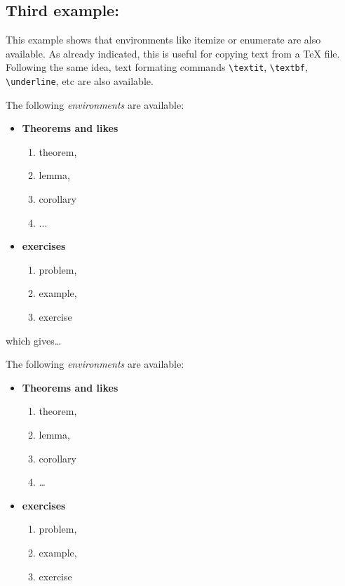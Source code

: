     \subsection{Third example:}\label{third-example}

    This example shows that environments like itemize or enumerate are also
available. As already indicated, this is useful for copying text from a
TeX file. Following the same idea, text formating commands
\texttt{\textbackslash{}textit}, \texttt{\textbackslash{}textbf},
\texttt{\textbackslash{}underline}, etc are also available.

    \begin{listing}
The following \textit{environments} are available:
\begin{itemize}
    \item \textbf{Theorems and likes}
    \begin{enumerate}
        \item theorem,
        \item lemma,
        \item corollary
        \item ...
    \end{enumerate}
    \item \textbf{exercises}
    \begin{enumerate}
        \item problem,
        \item example,
        \item exercise
    \end{enumerate}
\end{itemize}
\end{listing}

    which gives\ldots{}

The following \textit{environments} are available:
\begin{itemize} \item \textbf{Theorems and likes}
\begin{enumerate} \item theorem, \item lemma, \item corollary \item
\ldots{} \end{enumerate} \item \textbf{exercises}
\begin{enumerate} \item problem, \item example, \item exercise
\end{enumerate} \end{itemize}

